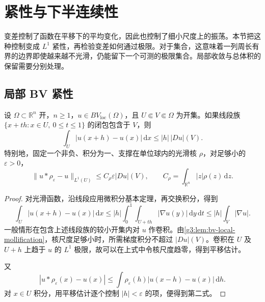 
% 
% 

\section{紧性与下半连续性}
\label{g3:sec:2102}

变差控制了函数在平移下的平均变化，因此也控制了细小尺度上的振荡。本节把这种控制变成 \(L^1\) 紧性，再检验变差如何通过极限。对于集合，这意味着一列周长有界的边界即使越来越不光滑，仍能留下一个可测的极限集合。局部收敛与总体积的保留需要分别处理。

\subsection{局部 BV 紧性}
\label{g3:subsec:2102:01}
\begin{lemma}\label{g3:lem:bv-translation-estimate}
	设 \(\Omega\subset\mathbb R^n\) 开，\(n\ge1\)，\(u\in BV_{\mathrm{loc}}(\Omega)\)，且 \(U\Subset V\Subset\Omega\) 为开集。如果线段族
	\(\{x+th:x\in U,\ 0\le t\le1\}\) 的闭包包含于 \(V\)，则
	\begin{equation}\label{g3:eq:bv-translation-estimate}
		\int_U|u(x+h)-u(x)|\,\mathrm dx\le |h|\,|Du|(V).
	\end{equation}
	特别地，固定一个非负、积分为一、支撑在单位球内的光滑核 \(\rho\)，对足够小的 \(\varepsilon>0\)，
	\begin{equation}\label{g3:eq:bv-mollification-error}
		\|u*\rho_\varepsilon-u\|_{L^1(U)}
		\le C_\rho\varepsilon |Du|(V),
		\qquad C_\rho=\int_{\mathbb R^n}|z|\rho(z)\,\mathrm dz.
	\end{equation}
\end{lemma}
\begin{proof}
	对光滑函数，沿线段应用微积分基本定理，再交换积分，得到
	\[
		\int_U|u(x+h)-u(x)|\,\mathrm dx
		\le |h|\int_0^1\int_{U+th}|\nabla u(y)|\,\mathrm dy\,\mathrm dt
		\le |h|\int_V|\nabla u|.
	\]
	一般情形在包含上述线段族的较小开集内对 \(u\) 作卷积。由\cref{g3:lem:bv-local-mollification}，核尺度足够小时，所需梯度积分不超过 \(|Du|(V)\)。卷积在 \(U\) 及 \(U+h\) 上趋于 \(u\) 的 \(L^1\) 极限，故可以在上式中令核尺度趋零，得到平移估计。

	又
	\[
		|u*\rho_\varepsilon(x)-u(x)|
		\le\int\rho_\varepsilon(h)|u(x-h)-u(x)|\,\mathrm dh.
	\]
	对 \(x\in U\) 积分，用平移估计逐个控制 \(|h|<\varepsilon\) 的项，便得到第二式。
\end{proof}

